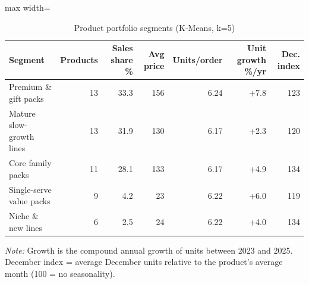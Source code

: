 \begin{table}[htbp]
\centering
\small
\caption{Product portfolio segments (K-Means, k=5)}
\label{tab:productclusters}
\begin{adjustbox}{max width=\linewidth}
\begin{tabular}{lrrrrrr}
\toprule
\textbf{Segment} & \textbf{Products} & \textbf{Sales share \%} & \textbf{Avg price} & \textbf{Units/order} & \textbf{Unit growth \%/yr} & \textbf{Dec. index} \\
\midrule
Premium \& gift packs & 13 & 33.3 & 156 & 6.24 & +7.8 & 123 \\
Mature slow-growth lines & 13 & 31.9 & 130 & 6.17 & +2.3 & 120 \\
Core family packs & 11 & 28.1 & 133 & 6.17 & +4.9 & 134 \\
Single-serve value packs & 9 & 4.2 & 23 & 6.22 & +6.0 & 119 \\
Niche \& new lines & 6 & 2.5 & 24 & 6.22 & +4.0 & 134 \\
\bottomrule
\end{tabular}
\end{adjustbox}
\par\smallskip\parbox{0.92\linewidth}{\footnotesize\emph{Note:} Growth is the compound annual growth of units between 2023 and 2025. December index = average December units relative to the product's average month (100 = no seasonality).}
\end{table}